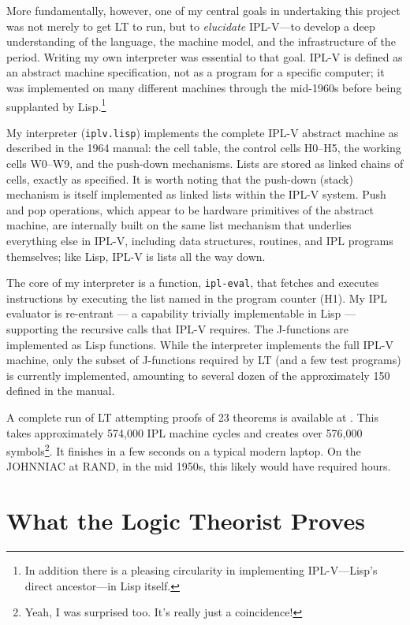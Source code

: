 \documentclass[journal]{IEEEtran}
\begin{document}
More fundamentally, however, one of my central goals in undertaking
this project was not merely to get LT to run, but to
\textit{elucidate} IPL-V---to develop a deep understanding of the
language, the machine model, and the infrastructure of the
period. Writing my own interpreter was essential to that goal. IPL-V
is defined as an abstract machine specification, not as a program for
a specific computer; it was implemented on many different machines
through the mid-1960s before being supplanted by Lisp.\footnote{In
addition there is a pleasing circularity in implementing
IPL-V---Lisp's direct ancestor---in Lisp itself.}

My interpreter (\texttt{iplv.lisp}) implements the complete IPL-V
abstract machine as described in the 1964 manual: the cell table, the
control cells H0--H5, the working cells W0--W9, and the push-down
mechanisms. Lists are stored as linked chains of cells, exactly as
specified. It is worth noting that the push-down (stack) mechanism is
itself implemented as linked lists within the IPL-V system. Push and
pop operations, which appear to be hardware primitives of the abstract
machine, are internally built on the same list mechanism that
underlies everything else in IPL-V, including data structures,
routines, and IPL programs themselves; like Lisp, IPL-V is lists all
the way down.

The core of my interpreter is a function, \texttt{ipl-eval}, that
fetches and executes instructions by executing the list named in the
program counter (H1). My IPL evaluator is re-entrant --- a capability
trivially implementable in Lisp --- supporting the recursive calls that
IPL-V requires. The J-functions are implemented as Lisp
functions. While the interpreter implements the full IPL-V machine,
only the subset of J-functions required by LT (and a few test
programs) is currently implemented, amounting to several dozen of the
approximately 150 defined in the manual.

A complete run of LT attempting proofs of 23 theorems is available at
\cite{runoutput}. This takes approximately 574,000 IPL machine cycles
and creates over 576,000 symbols\footnote{Yeah, I was surprised
too. It's really just a coincidence!}. It finishes in a few seconds on
a typical modern laptop. On the JOHNNIAC at RAND, in the mid 1950s,
this likely would have required hours.

\section{What the Logic Theorist Proves}
\label{sec:results}
\end{document}
